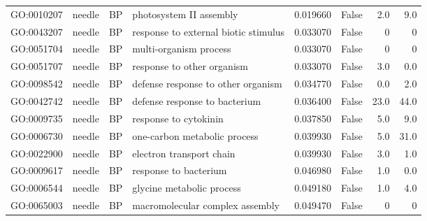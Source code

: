 \begin{longtable}{llllrlrr}
GO:0010207 & needle & BP &   photosystem II assembly  & 0.019660 &   False  & 2.0 & 9.0 \\ 
GO:0043207 & needle & BP &   response to external biotic stimulus  & 0.033070 &   False  & 0 & 0 \\
GO:0051704 & needle & BP &   multi-organism process  & 0.033070 &   False  & 0 & 0 \\
GO:0051707 & needle & BP &   response to other organism  & 0.033070 &   False  & 3.0 & 0.0 \\ 
GO:0098542 & needle & BP &   defense response to other organism  & 0.034770 &   False  & 0.0 & 2.0 \\ 
GO:0042742 & needle & BP &   defense response to bacterium  & 0.036400 &   False  & 23.0 & 44.0 \\ 
GO:0009735 & needle & BP &   response to cytokinin  & 0.037850 &   False  & 5.0 & 9.0 \\ 
GO:0006730 & needle & BP &   one-carbon metabolic process  & 0.039930 &   False  & 5.0 & 31.0 \\ 
GO:0022900 & needle & BP &   electron transport chain  & 0.039930 &   False  & 3.0 & 1.0 \\ 
GO:0009617 & needle & BP &   response to bacterium  & 0.046980 &   False  & 1.0 & 0.0 \\ 
GO:0006544 & needle & BP &   glycine metabolic process  & 0.049180 &   False  & 1.0 & 4.0 \\ 
GO:0065003 & needle & BP &   macromolecular complex assembly  & 0.049470 &   False  & 0 & 0 \\
\bottomrule
\end{longtable}
